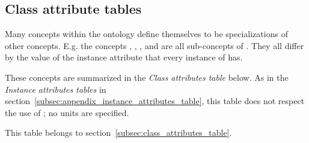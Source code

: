 \subsection{Class attribute tables}
\label{subsec:appendix_class_attributes}

Many concepts within the \thinkhomeweather ontology define themselves to be specializations of other concepts. E.g. the concepts , , ,  and  are all sub-concepts of . They all differ by the value of the instance attribute  that every instance of  has.

These concepts are summarized in the \emph{Class attributes table} below. As in the \emph{Instance attributes tables} in section~\ref{subsec:appendix_instance_attributes_table}, this table does not respect the use of \muo; no units are specified.

This table belongs to section~\ref{subsec:class_attributes_table}.

